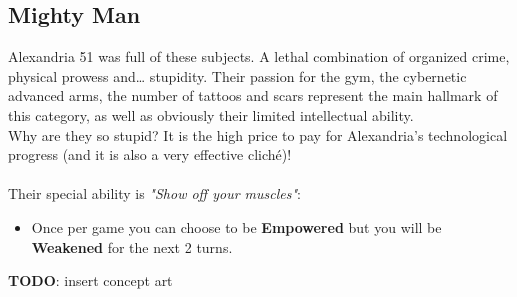\subsection{Mighty Man}
Alexandria 51 was full of these subjects. A lethal combination of organized crime, physical prowess and… stupidity. Their passion for the gym, the cybernetic advanced arms, the number of tattoos and scars represent the main hallmark of this category, as well as obviously their limited intellectual ability.\\
Why are they so stupid? It is the high price to pay for Alexandria's technological progress (and it is also a very effective cliché)!\\\\

Their special ability is \textit{"Show off your muscles"}:
\begin{itemize}
\item Once per game you can choose to be \textbf{Empowered} but you will be \textbf{Weakened} for the next 2 turns.
\end{itemize}
\textbf{TODO}: insert concept art